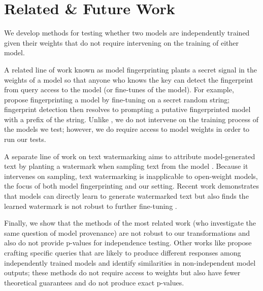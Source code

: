 \section{Related \& Future Work}\label{sec:related-work}

We develop methods for testing whether two models are independently trained given their weights that do not require intervening on the training of either model.

A related line of work known as model fingerprinting \citep{xu2024instructionalfingerprintinglargelanguage, zhang2024reefrepresentationencodingfingerprints, jin2024proflingofingerprintingbasedintellectualproperty, yang2024fingerprintlargelanguagemodels}
plants a secret signal in the weights of a model so that anyone who knows the key can detect the fingerprint from query access to the model (or fine-tunes of the model).
For example, \citet{xu2024instructionalfingerprintinglargelanguage} propose fingerprinting a model by fine-tuning on a secret random string; fingerprint detection then resolves to prompting a putative fingerprinted model with a prefix of the string.
Unlike \citet{xu2024instructionalfingerprintinglargelanguage}, we do not intervene on the training process of the models we test; however, we do require access to model weights in order to run our tests.

A separate line of work on text watermarking aims to attribute model-generated text by planting a watermark when sampling text from the model \citep{christ2023undetectablewatermarkslanguagemodels, kirchenbauer2024watermarklargelanguagemodels, kuditipudi2024robustdistortionfreewatermarkslanguage, aaronson2023watermarking, zhao2023provablerobustwatermarkingaigenerated}. 
Because it intervenes on sampling, text watermarking is inapplicable to open-weight models, the focus of both model fingerprinting and our setting. Recent work demonstrates that models can directly learn to generate watermarked text but also finds the learned watermark is not robust to further fine-tuning \citep{gu2024learnabilitywatermarkslanguagemodels}.

Finally, we show that the methods of the most related work \citep{zeng2024humanreadablefingerprintlargelanguage} (who investigate the same question of model provenance) are not robust to our transformations 
and also do not provide p-values for independence testing.
Other works like \citet{jin2024proflingofingerprintingbasedintellectualproperty} propose crafting specific queries that are likely to produce different responses among independently trained models and \cite{nikolic2025modelprovenancetestinglarge} identify similarities in non-independent model outputs; these methods do not require access to weights but also have fewer theoretical guarantees and do not produce exact p-values.

